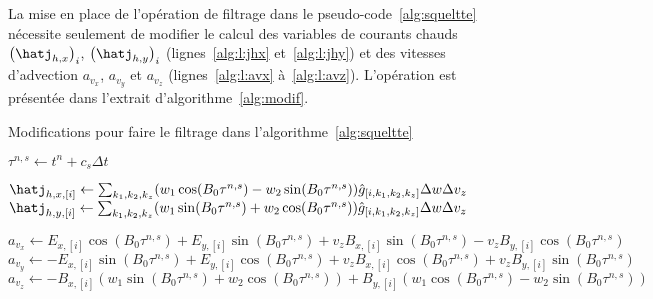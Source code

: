 La mise en place de l'opération de filtrage dans le pseudo-code~\ref{alg:squeltte} nécessite seulement de modifier le calcul des variables de courants chauds $\left(\hatj_{h,x}\right)_i$, $\left(\hatj_{h,y}\right)_i$ (lignes~\ref{alg:l:jhx} et~\ref{alg:l:jhy}) et des vitesses d'advection $a_{v_x}$, $a_{v_y}$ et $a_{v_z}$ (lignes~\ref{alg:l:avx} à~\ref{alg:l:avz}). L'opération est présentée dans l'extrait d'algorithme~\ref{alg:modif}.

\begin{algorithm}
  \caption{Modifications pour faire le filtrage dans l'algorithme~\ref{alg:squeltte}}
  \label{alg:modif}
  \begin{algorithmic}
    \State $\tau^{n,s} \gets t^n+c_s\Delta t$
  \end{algorithmic}
  \begin{algorithmic}[1]
    \State $\hatj_{h,x,[i]} \gets \sum_{k_1,k_2,k_z} ( w_1\cos(B_0\tau^{n,s}) - w_2\sin(B_0\tau^{n,s}) ) \hat{g}_{[i,k_1,k_2,k_z]} \Delta w\Delta v_z$
    \State $\hatj_{h,y,[i]} \gets \sum_{k_1,k_2,k_z} ( w_1\sin(B_0\tau^{n,s}) + w_2\cos(B_0\tau^{n,s}) ) \hat{g}_{[i,k_1,k_2,k_z]} \Delta w\Delta v_z$
  \end{algorithmic}
  \vspace{0.1cm}
  \begin{algorithmic}[1]
    \State $a_{v_x} \gets E_{x,[i]}\cos(B_0\tau^{n,s}) + E_{y,[i]}\sin(B_0\tau^{n,s}) + v_zB_{x,[i]}\sin(B_0\tau^{n,s}) - v_zB_{y,[i]}\cos(B_0\tau^{n,s})$
    \State $a_{v_y} \gets -E_{x,[i]}\sin(B_0\tau^{n,s}) + E_{y,[i]}\cos(B_0\tau^{n,s}) + v_zB_{x,[i]}\cos(B_0\tau^{n,s}) + v_zB_{y,[i]}\sin(B_0\tau^{n,s})$
    \State $a_{v_z} \gets -B_{x,[i]}(w_1\sin(B_0\tau^{n,s}) + w_2\cos(B_0\tau^{n,s})) + B_{y,[i]}(w_1\cos(B_0\tau^{n,s}) - w_2\sin(B_0\tau^{n,s}) )$
  \end{algorithmic}
\end{algorithm}

